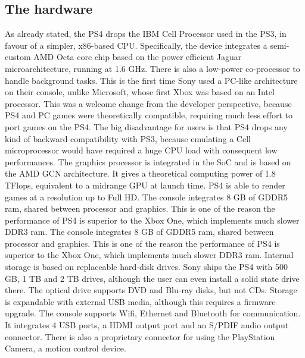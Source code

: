 \documentclass[a4paper,10pt]{book}
\begin{document}
 \subsection{ The hardware  }
  As already stated, the PS4 drops the IBM Cell Processor used in the PS3, in favour of a simpler, x86-based CPU. Specifically, the device integrates a semi-custom AMD Octa core chip based on the power efficient Jaguar microarchitecture, running at 1.6 GHz. There is also a low-power co-processor to handle background tasks.  
  This is the first time Sony used a PC-like architecture on their console, unlike Microsoft, whose first Xbox was based on an Intel processor. This was a welcome change from the developer perspective, because PS4 and PC games were theoretically compatible, requiring much less effort to port games on the PS4. The big disadvantage for users is that PS4 drops any kind of backward compatibility with PS3, because emulating a Cell microprocessor would have required a huge CPU load with consequent low performances.  
  The graphics processor is integrated in the SoC and is based on the AMD GCN architecture. It gives a theoretical computing power of 1.8 TFlops, equivalent to a midrange GPU at launch time. PS4 is able to render games at a resolution up to Full HD.  
  The console integrates 8 GB of GDDR5 ram, shared between processor and graphics. This is one of the reason the performance of PS4 is superior to the Xbox One, which implements much slower DDR3 ram.  
  The console integrates 8 GB of GDDR5 ram, shared between processor and graphics. This is one of the reason the performance of PS4 is superior to the Xbox One, which implements much slower DDR3 ram.  
  Internal storage is based on replaceable hard-disk drives. Sony ships the PS4 with 500 GB, 1 TB and 2 TB drives, although the user can even install a solid state drive there. The optical drive supports DVD and Blu-ray disks, but not CDs. Storage is expandable with external USB media, although this requires a firmware upgrade.  
  The console supports Wifi, Ethernet and Bluetooth for communication. It integrates 4 USB ports, a HDMI output port and an S/PDIF audio output connector. There is also a proprietary connector for using the PlayStation Camera, a motion control device.  
\end{document}
